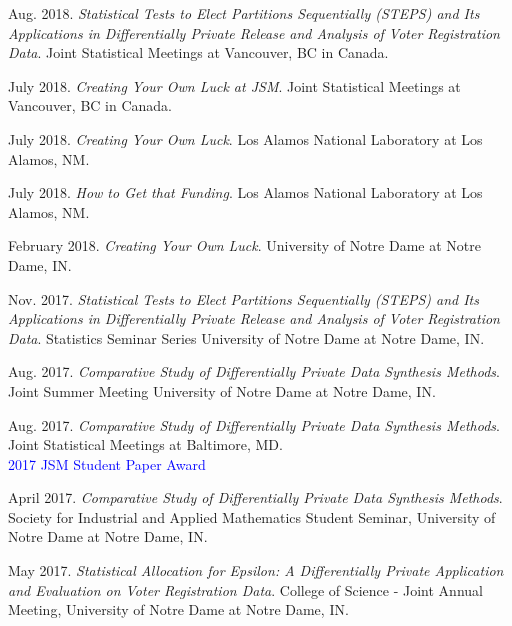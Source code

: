 \documentclass[11pt, letterpaper, roman]{moderncv} %
\begin{document}
\begin{etaremune}[topsep=0pt, itemsep=6pt, partopsep=0pt, parsep=0pt]
    \item Aug. 2018. \textit{Statistical Tests to Elect Partitions Sequentially (STEPS) and Its Applications in Differentially Private Release and Analysis of Voter Registration Data}. Joint Statistical Meetings at Vancouver, BC in Canada.
    
    \item July 2018. \textit{Creating Your Own Luck at JSM}. Joint Statistical Meetings at Vancouver, BC in Canada.
    
    \item July 2018. \textit{Creating Your Own Luck}. Los Alamos National Laboratory at Los Alamos, NM.
    
    \item July 2018. \textit{How to Get that Funding}. Los Alamos National Laboratory at Los Alamos, NM.
    
    \item February 2018. \textit{Creating Your Own Luck}. University of Notre Dame at Notre Dame, IN.
    
    \item Nov. 2017. \textit{Statistical Tests to Elect Partitions Sequentially (STEPS) and Its Applications in Differentially Private Release and Analysis of Voter Registration Data}. Statistics Seminar Series University of Notre Dame at Notre Dame, IN.
    
    \item Aug. 2017. \textit{Comparative Study of Differentially Private Data Synthesis Methods}. Joint Summer Meeting University of Notre Dame at Notre Dame, IN.
    
    \item Aug. 2017. \textit{Comparative Study of Differentially Private Data Synthesis Methods}. Joint Statistical Meetings at Baltimore, MD.\\
    \textcolor{blue}{2017 JSM Student Paper Award}
    
    \item April 2017. \textit{Comparative Study of Differentially Private Data Synthesis Methods}. Society for Industrial and Applied Mathematics Student Seminar, University of Notre Dame at Notre Dame, IN.
    
    \item May 2017. \textit{Statistical Allocation for Epsilon: A Differentially Private Application and Evaluation on Voter Registration Data}. College of Science - Joint Annual Meeting, University of Notre Dame at Notre Dame, IN.
    

\end{etaremune}
\end{document}
